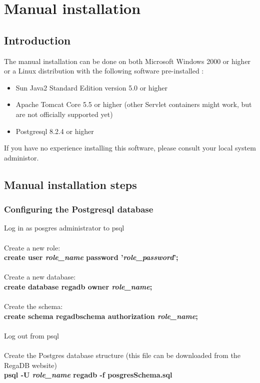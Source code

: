 \chapter{Manual installation}
\label{chapter:manual_install}

\section{Introduction}
The manual installation can be done on both Microsoft Windows 2000 or higher or a Linux distribution with the following software pre-installed : 
\begin{itemize}
\item Sun Java2 Standard Edition version 5.0 or higher
\item Apache Tomcat Core 5.5 or higher (other Servlet containers might work, but are not officially supported yet)
\item Postgresql 8.2.4 or higher
\end{itemize}
If you have no experience installing this software, please consult your local system administor.

\section{Manual installation steps}
\subsection{Configuring the Postgresql database}
Log in as posgres administrator to psql
\\
\\
Create a new role:
\\
\textbf{create user \textit{role\_name} password '\textit{role\_password}';}
\\
\\
Create a new database:
\\
\textbf{create database regadb owner \textit{role\_name};}
\\
\\
Create the schema:
\\
\textbf{create schema regadbschema authorization \textit{role\_name};}
\\
\\
Log out from psql
\\
\\
Create the Postgres database structure (this file can be downloaded from the RegaDB website)
\\
\textbf{psql -U \textit{role\_name} regadb -f posgresSchema.sql}

